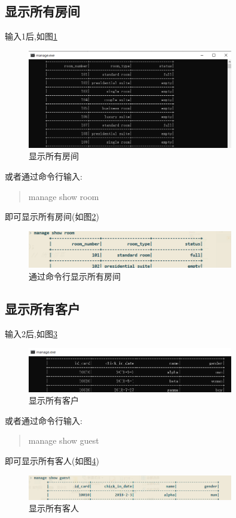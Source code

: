 \documentclass[UTF8]{ctexart}
\begin{document}
  \subsection{显示所有房间}
    输入1后,如图\ref{fig:1}
    \begin{figure}[H]
      \centering
      \includegraphics[width=0.8\textwidth]{1}
      \caption{显示所有房间}
      \label{fig:1}
    \end{figure}
    或者通过命令行输入:
    \begin{quote}
      manage show room
    \end{quote}
    即可显示所有房间(如图\ref{fig:c_1})
    \begin{figure}[H]
      \centering
      \includegraphics[width=0.8\textwidth]{c_1}
      \caption{通过命令行显示所有房间}
      \label{fig:c_1}
    \end{figure}
  \subsection{显示所有客户}
    输入2后,如图\ref{fig:2}
    \begin{figure}[H]
      \centering
      \includegraphics[width=0.8\textwidth]{2}
      \caption{显示所有客户}
      \label{fig:2}
    \end{figure}
    或者通过命令行输入:
    \begin{quote}
      manage show guest
    \end{quote}
    即可显示所有客人(如图\ref{fig:c_2})
    \begin{figure}[H]
      \centering
      \includegraphics[width=0.8\textwidth]{c_2}
      \caption{显示所有客人}
      \label{fig:c_2}
    \end{figure}
\end{document}
